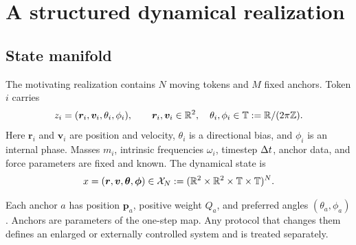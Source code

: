 \section{A structured dynamical realization}
\label{sec:model}

\subsection{State manifold}

The motivating realization contains \(N\) moving tokens and \(M\) fixed anchors. Token \(i\) carries
\begin{equation}
  z_i=(\bm r_i,\bm v_i,\theta_i,\phi_i),
  \qquad
  \bm r_i,\bm v_i\in\mathbb R^2,
  \quad
  \theta_i,\phi_i\in\mathbb T:=\mathbb R/(2\pi\mathbb Z).
  \label{eq:token-state}
\end{equation}
Here \(\bm r_i\) and \(\bm v_i\) are position and velocity, \(\theta_i\) is a directional bias, and \(\phi_i\) is an internal phase. Masses \(m_i\), intrinsic frequencies \(\omega_i\), timestep \(\Delta t\), anchor data, and force parameters are fixed and known. The dynamical state is
\begin{equation}
  x=(\bm r,\bm v,\bm\theta,\bm\phi)
  \in
  \mathcal X_N
  :=
  (\mathbb R^2\times\mathbb R^2\times\mathbb T\times\mathbb T)^N.
  \label{eq:state-space}
\end{equation}

Each anchor \(a\) has position \(\bm p_a\), positive weight \(Q_a\), and preferred angles \((\theta_a,\phi_a)\). Anchors are parameters of the one-step map. Any protocol that changes them defines an enlarged or externally controlled system and is treated separately.

